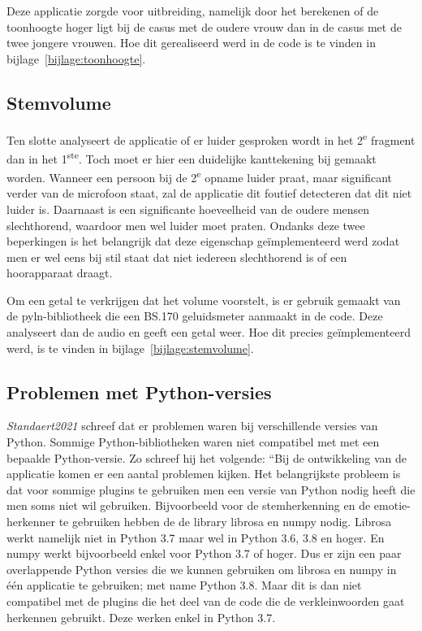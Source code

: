 Deze applicatie zorgde voor uitbreiding, namelijk door het berekenen of de toonhoogte hoger ligt bij de casus met de oudere vrouw dan in de casus met de twee jongere vrouwen.
Hoe dit gerealiseerd werd in de code is te vinden in bijlage~\ref{bijlage:toonhoogte}.

\subsection{Stemvolume}
Ten slotte analyseert de applicatie of er luider gesproken wordt in het 2\textsuperscript{e} fragment dan in het 1\textsuperscript{ste}. Toch moet er hier een duidelijke kanttekening bij gemaakt worden. Wanneer een persoon bij de 2\textsuperscript{e} opname luider praat, maar significant verder van de microfoon staat, zal de applicatie dit foutief detecteren  dat dit niet luider is. Daarnaast is een significante hoeveelheid van de oudere mensen slechthorend, waardoor men wel luider moet praten. Ondanks deze twee beperkingen is het belangrijk dat deze eigenschap geïmplementeerd werd zodat men er wel eens bij stil staat dat niet iedereen slechthorend is of een hoorapparaat draagt.

Om een getal te verkrijgen dat het volume voorstelt, is er gebruik gemaakt van de pyln-bibliotheek die een BS.170 geluidsmeter aanmaakt in de code. Deze analyseert dan de audio en geeft een getal weer. Hoe dit precies geïmplementeerd werd, is te vinden in bijlage~\ref{bijlage:stemvolume}.

\subsection{Problemen met Python-versies}
\textit{Standaert2021} schreef dat er problemen waren bij verschillende versies van Python. Sommige Python-bibliotheken waren niet compatibel met met een bepaalde Python-versie. Zo schreef hij het volgende:
``Bij de ontwikkeling van de applicatie komen er een aantal problemen kijken. Het belangrijkste
probleem is dat voor sommige plugins te gebruiken men een versie van Python
nodig heeft die men soms niet wil gebruiken. Bijvoorbeeld voor de stemherkenning en
de emotie-herkenner te gebruiken hebben de de library librosa en numpy nodig. Librosa
werkt namelijk niet in Python 3.7 maar wel in Python 3.6, 3.8 en hoger. En numpy werkt
bijvoorbeeld enkel voor Python 3.7 of hoger. Dus er zijn een paar overlappende Python
versies die we kunnen gebruiken om librosa en numpy in één applicatie te gebruiken; met
name Python 3.8. Maar dit is dan niet compatibel met de plugins die het deel van de code
die de verkleinwoorden gaat herkennen gebruikt. Deze werken enkel in Python 3.7.

